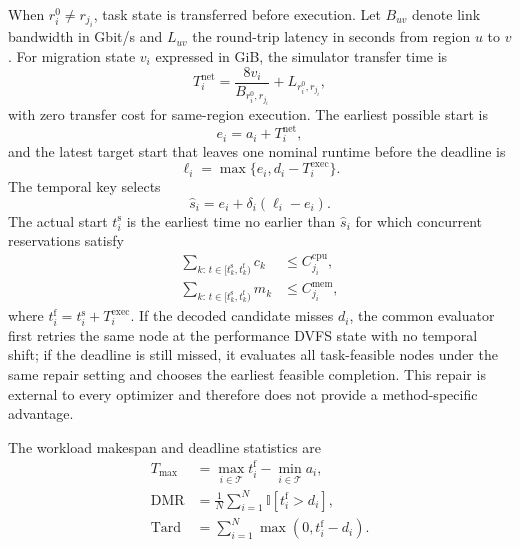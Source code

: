 \documentclass[preprint,12pt]{elsarticle}
\begin{document}
When $r_i^0\neq r_{j_i}$, task state is transferred before execution. Let $B_{uv}$ denote link bandwidth in Gbit/s and $L_{uv}$ the round-trip latency in seconds from region $u$ to $v$. For migration state $v_i$ expressed in GiB, the simulator transfer time is
\begin{equation}
T^{\mathrm{net}}_i=\frac{8v_i}{B_{r_i^0,r_{j_i}}}+L_{r_i^0,r_{j_i}},
\label{eq:transfer-time}
\end{equation}
with zero transfer cost for same-region execution. The earliest possible start is
\begin{equation}
e_i=a_i+T^{\mathrm{net}}_i,
\end{equation}
and the latest target start that leaves one nominal runtime before the deadline is
\begin{equation}
\ell_i=\max\{e_i,d_i-T^{\mathrm{exec}}_i\}.
\end{equation}
The temporal key selects
\begin{equation}
\hat{s}_i=e_i+\delta_i(\ell_i-e_i).
\label{eq:temporal-target}
\end{equation}
The actual start $t_i^{\mathrm{s}}$ is the earliest time no earlier than $\hat{s}_i$ for which concurrent reservations satisfy
\begin{align}
\sum_{k:\,t\in[t_k^{\mathrm{s}},t_k^{\mathrm{f}})} c_k &\le C^{\mathrm{cpu}}_{j_i}, \\
\sum_{k:\,t\in[t_k^{\mathrm{s}},t_k^{\mathrm{f}})} m_k &\le C^{\mathrm{mem}}_{j_i},
\label{eq:resource-capacity}
\end{align}
where $t_i^{\mathrm{f}}=t_i^{\mathrm{s}}+T^{\mathrm{exec}}_i$. If the decoded candidate misses $d_i$, the common evaluator first retries the same node at the performance DVFS state with no temporal shift; if the deadline is still missed, it evaluates all task-feasible nodes under the same repair setting and chooses the earliest feasible completion. This repair is external to every optimizer and therefore does not provide a method-specific advantage.

The workload makespan and deadline statistics are
\begin{align}
T_{\max} &= \max_{i\in\mathcal{T}} t_i^{\mathrm{f}}-\min_{i\in\mathcal{T}} a_i, \\
\mathrm{DMR} &= \frac{1}{N}\sum_{i=1}^{N}\mathbb{I}[t_i^{\mathrm{f}}>d_i], \\
\mathrm{Tard} &= \sum_{i=1}^{N}\max(0,t_i^{\mathrm{f}}-d_i).
\label{eq:latency-metrics}
\end{align}
\end{document}
